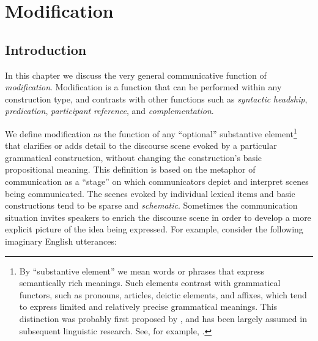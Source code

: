 \chapter{Modification}
\label{chap:modification}
\section{Introduction}
\label{sec:introduction-4}

In this chapter we discuss the very general communicative function of \textit{modification}.  Modification is a function that can be performed within any construction type, and contrasts with other functions such as \textit{syntactic} \textit{headship}, \textit{predication}, \textit{participant} \textit{reference}\is{}\is{},\is{}\is{} and \textit{complementation}.

We define modification as the function of any “optional” substantive element\footnote{By “substantive element” we mean words or phrases that express semantically rich meanings. Such elements contrast with grammatical functors, such as pronouns, articles, deictic elements, and affixes, which tend to express limited and relatively precise grammatical meanings. This distinction was probably first proposed by \citet{fries1952}, and has been largely assumed in subsequent linguistic research. See, for example, \citet[66--67]{payne2011}.} that clarifies or adds detail to the discourse scene evoked by a particular grammatical construction, without changing the construction’s basic propositional meaning. This definition is based on the metaphor of communication as a “stage” on which communicators depict and interpret scenes being communicated. The scenes evoked by individual lexical items and basic constructions tend to be sparse and \textit{schematic}. Sometimes the communication situation invites speakers to enrich the discourse scene in order to develop a more explicit picture of the idea being expressed. For example, consider the following imaginary English utterances:

